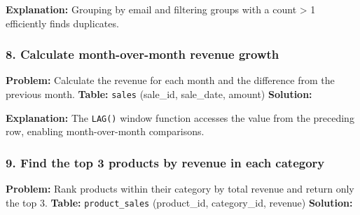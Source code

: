 \textbf{Explanation:} Grouping by email and filtering groups with a
count \textgreater{} 1 efficiently finds duplicates.

\subsubsection{8. Calculate month-over-month revenue
growth}\label{calculate-month-over-month-revenue-growth}

\textbf{Problem:} Calculate the revenue for each month and the
difference from the previous month. \textbf{Table:} \texttt{sales}
(sale\_id, sale\_date, amount) \textbf{Solution:}

\begin{Shaded}
\begin{Highlighting}[]
\NormalTok{ (}
     \NormalTok{, }
      
\NormalTok{)}
    \NormalTok{, }
    \NormalTok{ (}  \NormalTok{) }
\OperatorTok{{-}} \NormalTok{ (}  \NormalTok{) }
\end{Highlighting}
\end{Shaded}

\textbf{Explanation:} The \texttt{LAG()} window function accesses the
value from the preceding row, enabling month-over-month comparisons.

\subsubsection{9. Find the top 3 products by revenue in each
category}\label{find-the-top-3-products-by-revenue-in-each-category}

\textbf{Problem:} Rank products within their category by total revenue
and return only the top 3. \textbf{Table:} \texttt{product\_sales}
(product\_id, category\_id, revenue) \textbf{Solution:}

